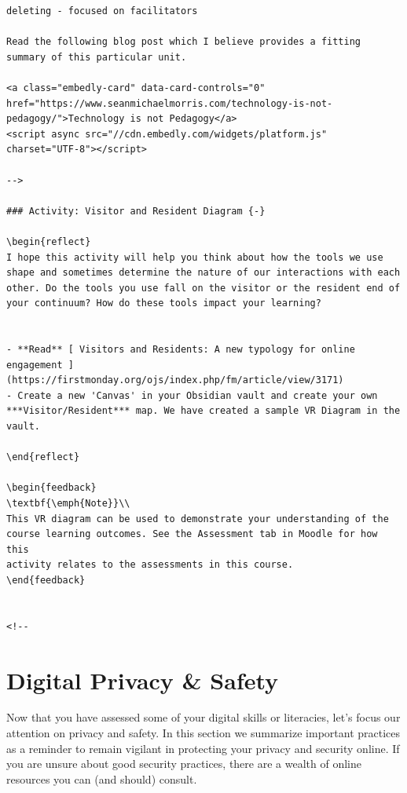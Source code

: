 \documentclass[
]{book}
\theoremstyle{definition}
\theoremstyle{definition}
\theoremstyle{definition}
\theoremstyle{definition}
\theoremstyle{remark}
\begin{document}
\begin{verbatim}
deleting - focused on facilitators

Read the following blog post which I believe provides a fitting summary of this particular unit.

<a class="embedly-card" data-card-controls="0" href="https://www.seanmichaelmorris.com/technology-is-not-pedagogy/">Technology is not Pedagogy</a>
<script async src="//cdn.embedly.com/widgets/platform.js" charset="UTF-8"></script>

-->

### Activity: Visitor and Resident Diagram {-}

\begin{reflect}
I hope this activity will help you think about how the tools we use shape and sometimes determine the nature of our interactions with each other. Do the tools you use fall on the visitor or the resident end of your continuum? How do these tools impact your learning?


- **Read** [ Visitors and Residents: A new typology for online engagement ](https://firstmonday.org/ojs/index.php/fm/article/view/3171)  
- Create a new 'Canvas' in your Obsidian vault and create your own ***Visitor/Resident*** map. We have created a sample VR Diagram in the vault. 

\end{reflect}

\begin{feedback}
\textbf{\emph{Note}}\\
This VR diagram can be used to demonstrate your understanding of the
course learning outcomes. See the Assessment tab in Moodle for how this
activity relates to the assessments in this course.
\end{feedback}


<!--

\end{verbatim}

\hypertarget{digital-privacy-safety}{%
\section{Digital Privacy \& Safety}\label{digital-privacy-safety}}

Now that you have assessed some of your digital skills or literacies, let's focus our attention on privacy and safety. In this section we summarize important practices as a reminder to remain vigilant in protecting your privacy and security online. If you are unsure about good security practices, there are a wealth of online resources you can (and should) consult.
\end{document}
